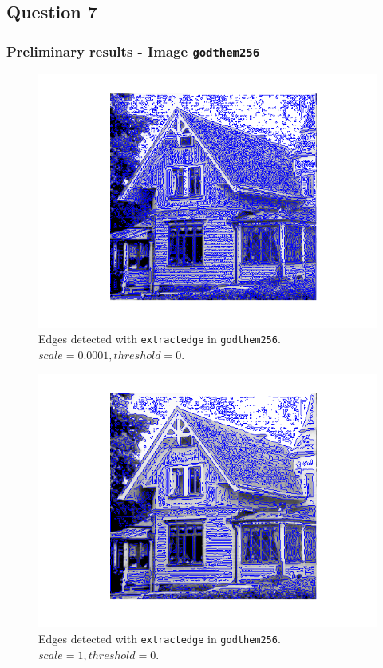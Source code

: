 \subsection{Question 7}

\subsubsection{Preliminary results - Image \texttt{godthem256}}

\begin{figure}[H]
	\centering
	\includegraphics[scale=0.8]{./images/Q7/house/0.0001_0.png}
	\caption{Edges detected with \texttt{extractedge} in \texttt{godthem256}. $scale = 0.0001, threshold = 0$.}
	\label{fig:Q7_house_0.0001_0}
\end{figure}

\begin{figure}[H]
	\centering
	\includegraphics[scale=0.8]{./images/Q7/house/1_0.png}
	\caption{Edges detected with \texttt{extractedge} in \texttt{godthem256}. $scale = 1, threshold = 0$.}
	\label{fig:Q7_house_1_0}
\end{figure}

